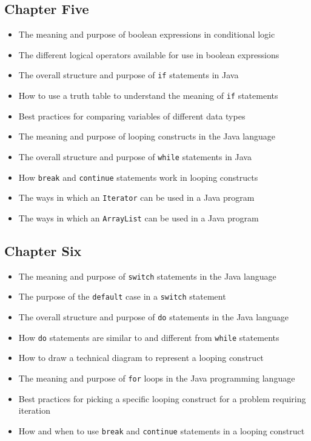 \documentclass[11pt]{article}
\begin{document}
\subsection*{Chapter Five}

\begin{itemize}

  \item The meaning and purpose of boolean expressions in conditional logic
  \item The different logical operators available for use in boolean expressions
  \item The overall structure and purpose of {\tt if} statements in Java
  \item How to use a truth table to understand the meaning of {\tt if} statements
  \item Best practices for comparing variables of different data types
  \item The meaning and purpose of looping constructs in the Java language
  \item The overall structure and purpose of {\tt while} statements in Java
  \item How {\tt break} and {\tt continue} statements work in looping constructs
  \item The ways in which an {\tt Iterator} can be used in a Java program
  \item The ways in which an {\tt ArrayList} can be used in a Java program

\end{itemize}

\subsection*{Chapter Six}

\begin{itemize}

  \item The meaning and purpose of {\tt switch} statements in the Java language
  \item The purpose of the {\tt default} case in a {\tt switch} statement
  \item The overall structure and purpose of {\tt do} statements in the Java language
  \item How {\tt do} statements are similar to and different from {\tt while} statements
  \item How to draw a technical diagram to represent a looping construct
  \item The meaning and purpose of {\tt for} loops in the Java programming language
  \item Best practices for picking a specific looping construct for a problem requiring iteration
  \item How and when to use {\tt break} and {\tt continue} statements in a looping construct

\end{itemize}
\end{document}
